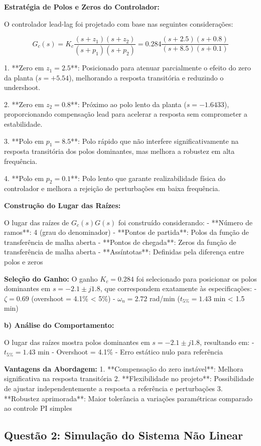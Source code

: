\documentclass[a4paper,12pt]{article}
\begin{document}
\textbf{Estratégia de Polos e Zeros do Controlador:}

O controlador lead-lag foi projetado com base nas seguintes considerações:

$$G_c(s) = K_c \frac{(s + z_1)(s + z_2)}{(s + p_1)(s + p_2)} = 0.284 \frac{(s + 2.5)(s + 0.8)}{(s + 8.5)(s + 0.1)}$$

1. **Zero em $z_1 = 2.5$**: Posicionado para atenuar parcialmente o efeito do zero da planta ($s = +5.54$), melhorando a resposta transitória e reduzindo o undershoot.

2. **Zero em $z_2 = 0.8$**: Próximo ao polo lento da planta ($s = -1.6433$), proporcionando compensação lead para acelerar a resposta sem comprometer a estabilidade.

3. **Polo em $p_1 = 8.5$**: Polo rápido que não interfere significativamente na resposta transitória dos polos dominantes, mas melhora a robustez em alta frequência.

4. **Polo em $p_2 = 0.1$**: Polo lento que garante realizabilidade física do controlador e melhora a rejeição de perturbações em baixa frequência.

\textbf{Construção do Lugar das Raízes:}

O lugar das raízes de $G_c(s)G(s)$ foi construído considerando:
- **Número de ramos**: 4 (grau do denominador)
- **Pontos de partida**: Polos da função de transferência de malha aberta
- **Pontos de chegada**: Zeros da função de transferência de malha aberta
- **Assíntotas**: Definidas pela diferença entre polos e zeros

\textbf{Seleção do Ganho:}
O ganho $K_c = 0.284$ foi selecionado para posicionar os polos dominantes em $s = -2.1 \pm j1.8$, que correspondem exatamente às especificações:
- $\zeta = 0.69$ (overshoot = 4.1\% < 5\%)
- $\omega_n = 2.72$ rad/min ($t_{5\%} = 1.43$ min < 1.5 min)

\textbf{b) Análise do Comportamento:}

O lugar das raízes mostra polos dominantes em $s = -2.1 \pm j1.8$, resultando em:
- $t_{5\%} = 1.43$ min
- Overshoot = 4.1\%
- Erro estático nulo para referência

\textbf{Vantagens da Abordagem:}
1. **Compensação do zero instável**: Melhora significativa na resposta transitória
2. **Flexibilidade no projeto**: Possibilidade de ajustar independentemente a resposta a referência e perturbações
3. **Robustez aprimorada**: Maior tolerância a variações paramétricas comparado ao controle PI simples

\subsection{Questão 2: Simulação do Sistema Não Linear}
\end{document}
